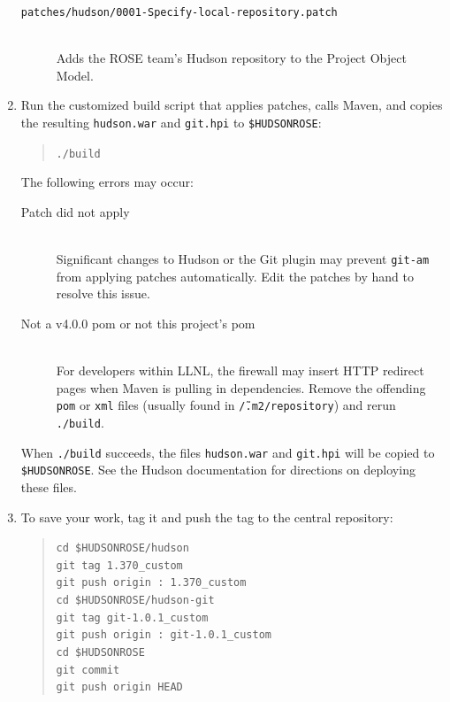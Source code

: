 \begin{enumerate}
{\begin{description}
\item[\texttt{patches/hudson/0001-Specify-local-repository.patch}]
\hfill \\
Adds the ROSE team's Hudson repository to the Project Object Model.

\end{description}


}

\item{
Run the customized build script that applies patches, calls Maven, and
copies the resulting \texttt{hudson.war} and \texttt{git.hpi} to
\texttt{\$HUDSONROSE}:
  \begin{quote}
  \texttt{./build}
  \end{quote}
The following errors may occur: 
  \begin{description}
  \item[Patch did not apply]{\hfill \\ Significant changes to Hudson or the Git
plugin may prevent \texttt{git-am} from applying patches automatically. Edit the
patches by hand to resolve this issue.}
  \item[Not a v4.0.0 pom or not this project's pom]{\hfill \\ For developers
within LLNL, the firewall may insert HTTP redirect pages when Maven is
pulling in dependencies. Remove the offending \texttt{pom} or
\texttt{xml} files
(usually found in \texttt{\~/.m2/repository}) and rerun
\texttt{./build}.}
  \end{description}
When \texttt{./build} succeeds, the files \texttt{hudson.war} and
\texttt{git.hpi} will be copied to \texttt{\$HUDSONROSE}. See the Hudson
documentation for directions on deploying these files.
}

\item{
To save your work, tag it and push the
tag to the central repository:
  \begin{quote} \texttt{cd \$HUDSONROSE/hudson \\
  git tag 1.370\_custom \\
  git push origin : 1.370\_custom \\
  cd \$HUDSONROSE/hudson-git \\
  git tag git-1.0.1\_custom \\
  git push origin : git-1.0.1\_custom \\
  cd \$HUDSONROSE \\
  git commit \\
  git push origin HEAD}
  \end{quote}
}
\end{enumerate}

